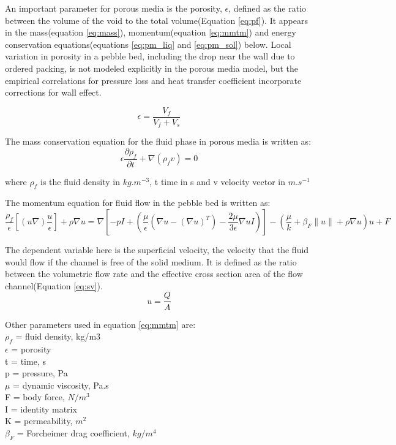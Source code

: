 \documentclass{elsarticle}
\begin{document}
An important parameter for porous media is the porosity, $\epsilon$, defined as the ratio between the volume of the void to the total volume(Equation \ref{eq:pf}). It appears in the mass(equation \ref{eq:mass}), momentum(equation \ref{eq:mmtm}) and energy conservation equations(equations \ref{eq:pm_liq} and \ref{eq:pm_sol}) below. Local variation in porosity in a pebble bed, including the drop near the wall due to ordered packing, is not modeled explicitly in the porous media model, but the empirical correlations for pressure loss and heat transfer coefficient incorporate corrections for wall effect.


\begin{equation}
  \epsilon = \frac{V_f}{V_f+V_s}
  \label{eq:pf}
\end{equation}

The mass conservation equation for the fluid phase in porous media is written as:
\begin{equation}
  \epsilon\frac{\partial \rho_f}{\partial t} + \nabla(\rho_fv) = 0
  \label{eq:mass}
\end{equation}

where $\rho_f$ is the fluid density in $kg.m^{-3}$, t time in s and v velocity vector in $m.s^{-1}$

The momentum equation for fluid flow in the pebble bed is written as:
\begin{equation}
  \frac{\rho_f}{\epsilon} \left[(u\nabla)\frac{u}{\epsilon} \right] + \rho\nabla u = \nabla \left[ -pI + (\frac{\mu}{\epsilon}(\nabla u - (\nabla u)^T) - \frac{2\mu}{3\epsilon} \nabla u I)\right] - (\frac{\mu}{k} + \beta_F \|u\| + \rho\nabla u) u + F
  \label{eq:mmtm}
\end{equation}

The dependent variable here is the superficial velocity, the velocity that the fluid would flow if the channel is free of the solid medium. It is defined as the ratio between the volumetric flow rate and the effective cross section area of the flow channel(Equation \ref{eq:sv}).
\begin{equation}
  u=\frac{Q}{A}
  \label{eq:sv}
\end{equation}

Other parameters used in equation \ref{eq:mmtm} are:\\
$\rho_f$ = fluid density, kg/m3\\
$\epsilon$ = porosity\\
t = time, s\\
p = pressure, Pa\\
$\mu$ = dynamic viscosity, Pa.s\\
F = body force, $N/m^3$\\
I = identity matrix\\
K = permeability, $m^2$\\
$\beta_F$ = Forcheimer drag coefficient, $kg/m^4$\\
\end{document}
